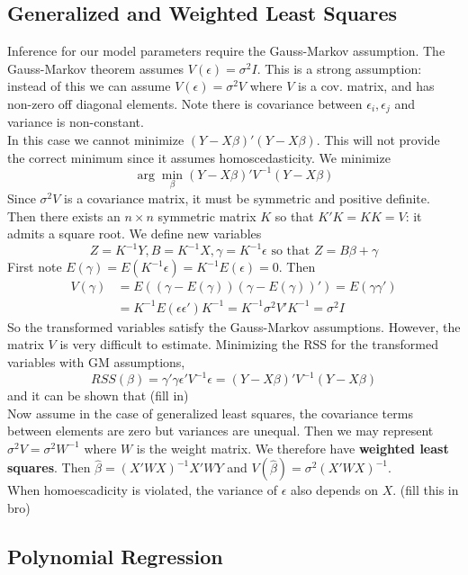 \documentclass[12pt, a4paper]{article}
\theoremstyle{definition}
\newcommand{\eps}{\epsilon}
\newcommand{\BB}[1]{\left(#1\right)}
\begin{document}
	\subsection{Generalized and Weighted Least Squares}
	
	Inference for our model parameters require the Gauss-Markov assumption. The Gauss-Markov theorem assumes $V(\eps) = \sigma^2 I$. This is a strong assumption: instead of this we can assume $V(\eps) = \sigma^2 V$ where $V$ is a cov. matrix, and has non-zero off diagonal elements. Note there is covariance between $\eps_i, \eps_j$ and variance is non-constant.\\
	
	In this case we cannot minimize $(Y - X\beta)'(Y-X\beta)$. This will not provide the correct minimum since it assumes homoscedasticity. We minimize
	$$
		\arg \min_\beta (Y - X\beta)'V^{-1}(Y-X\beta)
	$$
	Since $\sigma^2V$ is a covariance matrix, it must be symmetric and positive definite. Then there exists an $n \times n$ symmetric matrix $K$ so that $K'K = KK = V$: it admits a square root. We define new variables 
	$$Z = K^{-1}Y, B=K^{-1}X, \gamma = K^{-1}\eps \text{ so that } Z = B\beta + \gamma$$
	First note $E(\gamma) = E(K^{-1} \eps ) = K^{-1}E(\eps) = 0$.
	Then 
	\begin{align*}
		V(\gamma) &= E\BB{(\gamma - E(\gamma))(\gamma - E(\gamma))'} = E\BB{\gamma\gamma'} \\
		&= K^{-1}E(\eps\eps')K^{-1} = K^{-1}\sigma^2V'K^{-1} = \sigma^2 I 
	\end{align*}
	So the transformed variables satisfy the Gauss-Markov assumptions. However, the matrix $V$ is very difficult to estimate. Minimizing the RSS for the transformed variables with GM assumptions,
	$$RSS(\beta) = \gamma'\gamma \eps'V^{-1}\eps = (Y-X\beta)'V^{-1}(Y-X\beta)$$
	and it can be shown that (fill in)\\

	Now assume in the case of generalized least squares, the covariance terms between elements are zero but variances are unequal. Then we may represent $\sigma^2V = \sigma^2W^{-1}$ where $W$ is the weight matrix. We therefore have {\bf weighted least squares}. Then $\hat \beta = (X'WX)^{-1}X'WY$ and $V(\hat \beta) = \sigma^2 (X'WX)^{-1}$. \\
	
	When homoescadicity is violated, the variance of $\eps$ also depends on $X$. (fill this in bro)
	
	\subsection{Polynomial Regression}
	
\end{document}
